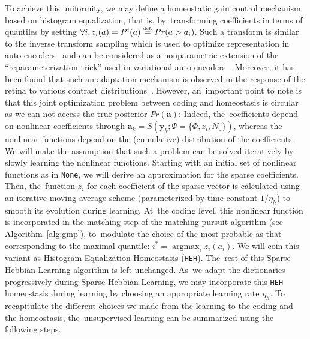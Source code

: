 \documentclass[vision,article,accept,oneauthor,pdftex]{Definitions/mdpi}
\DeclareMathOperator*{\ArgMax}{\arg\max}   %
\newcommand{\coef}{\mathbf{a}} %
\newcommand{\image}{\mathbf{y}} %
\newcommand{\dico}{\Phi} %
\newcommand{\eqdef}{\ensuremath{\stackrel{\mbox{\upshape\tiny def.}}{=}}}
\begin{document}

To achieve this uniformity, we may define a homeostatic gain control mechanism based on histogram equalization, that is, by~transforming coefficients in terms of quantiles by setting $\forall i, z_i( a ) = P^i(a) \eqdef Pr( a > a_i)$. Such a transform is similar to the inverse transform sampling which is used to optimize representation in auto-encoders~\citep{Doersch2016} and can be considered as a nonparametric extension of the ``reparameterization trick'' used in variational auto-encoders~\citep{Kingma13}. %
Moreover, it has been found that such an adaptation mechanism is observed in the response of the retina to various contrast distributions~\citep{Laughlin81}. However, an~important point to note is that this joint optimization problem between coding and homeostasis is circular as we can not access the true posterior $Pr(\coef)$: Indeed, the~coefficients depend on nonlinear coefficients through $\coef_{k} = S(\image_k; \Psi=\{\dico, z_i, N_0\})$, whereas the nonlinear functions depend on the (cumulative) distribution of the coefficients. We will make the assumption that such a problem can be solved iteratively by slowly learning the nonlinear functions. Starting with an initial set of nonlinear functions as in \texttt{None}, we will derive an approximation for the sparse coefficients. Then, the~function $z_i$ for each coefficient of the sparse vector is calculated using an iterative moving average scheme (parameterized by time constant $1/\eta_h$) to smooth its evolution during learning. At~the coding level, this nonlinear function is incorporated in the matching step of the matching pursuit algorithm (see Algorithm~\ref{alg:gmp}), to~modulate the choice of the most probable as that corresponding to the maximal quantile: $i^\ast = \ArgMax_i z_i(a_i)$. We will coin this variant as Histogram Equalization Homeostasis (\texttt{HEH}). The~rest of this Sparse Hebbian Learning algorithm is left unchanged. As~we adapt the dictionaries progressively during Sparse Hebbian Learning, we may incorporate this \texttt{HEH} homeostasis during learning by choosing an appropriate learning rate $\eta_h$.
To recapitulate the different choices we made from the learning to the coding and the homeostasis, the~unsupervised learning can be summarized using the following steps.
\end{document}
